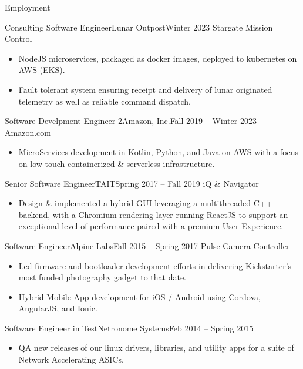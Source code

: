 \documentclass[]{mussocv}
\begin{document}
	\makeheader
	
	\begin{cvsection}{Employment}
		\begin{cvsubsection}{Consulting Software Engineer}{Lunar Outpost}{Winter 2023}
			Stargate Mission Control			
			\begin{itemize}
				\item NodeJS microservices, packaged as docker images, deployed to kubernetes on AWS (EKS). 
				\item Fault tolerant system ensuring receipt and delivery of lunar originated telemetry as well as reliable command dispatch. 
			\end{itemize}
		\end{cvsubsection}
		
		\begin{cvsubsection}{Software Develpment Engineer 2}{Amazon, Inc.}{Fall 2019 -- Winter 2023}
			Amazon.com
			\begin{itemize}
				\item MicroServices development in Kotlin, Python, and Java on AWS with a focus on low touch containerized & serverless infrastructure.
			\end{itemize}
		\end{cvsubsection}
		
		\begin{cvsubsection}{Senior Software Engineer}{TAIT}{Spring 2017 -- Fall 2019}
			iQ & Navigator 
			\begin{itemize}
				\item Design & implemented a hybrid GUI leveraging a multithreaded C++ backend, with a Chromium rendering layer running ReactJS to support an exceptional level of performance paired with a premium User Experience.
			\end{itemize}
		\end{cvsubsection}
		
		\begin{cvsubsection}{Software Engineer}{Alpine Labs}{Fall 2015 -- Spring 2017}
			Pulse Camera Controller	
			\begin{itemize}
				\item Led firmware and bootloader development efforts in delivering Kickstarter's most funded photography gadget to that date.
				\item Hybrid Mobile App development for iOS / Android using Cordova, AngularJS, and Ionic.
			\end{itemize}
		\end{cvsubsection}

		\begin{cvsubsection}{Software Engineer in Test}{Netronome Systems}{Feb 2014 -- Spring 2015}
			\begin{itemize}
				\item QA new releases of our linux drivers, libraries, and utility apps for a suite of Network Accelerating ASICs.
			\end{itemize}
		\end{cvsubsection}
	\end{cvsection}
	
\end{document}
